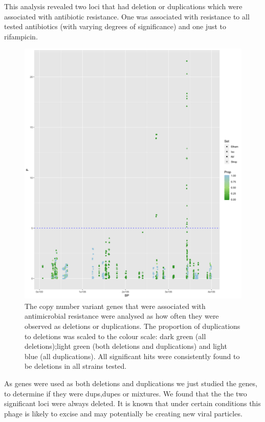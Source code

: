 This analysis revealed two loci that had deletion or duplications which were associated with antibiotic resistance. One was associated with resistance to all tested antibiotics (with varying degrees of significance) and one just to rifampicin.

\begin{figure}[h!]
\centering
\includegraphics[width=\textwidth{}]{Chapter_3/Rplot22.png}
\caption{The copy number variant genes that were associated with antimicrobial resistance were analysed as how often they were observed as deletions or duplications. The proportion of duplications to deletions was scaled to the colour scale: dark green (all deletions);light green (both deletions and duplications) and light blue (all duplications). All significant hits were consistently found to be deletions in all strains tested.}
\label{fig:MDR_Man_PC3}
\end{figure}




As genes were used as both deletions and duplications we just studied the genes, to determine if they were dups,dupes or mixtures. We found that the the two significant loci were always deleted. It is known that under certain conditions this phage is likely to excise and may potentially be creating new viral particles.



